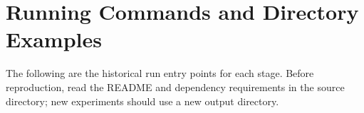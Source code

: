 \chapter{Running Commands and Directory Examples}

The following are the historical run entry points for each stage. Before reproduction, read the README and dependency requirements in the source directory; new experiments should use a new output directory.
